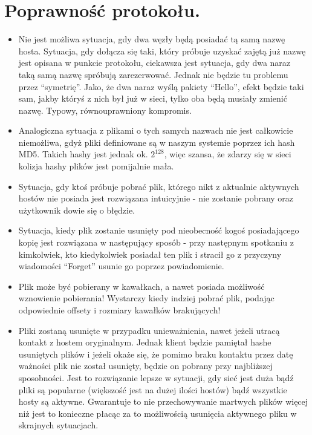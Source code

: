 \documentclass[10pt,a4paper]{article}
\begin{document}
\section{Poprawność protokołu.}
\begin{itemize}
\item Nie jest możliwa sytuacja, gdy dwa węzły będą posiadać tą samą nazwę hosta. Sytuacja, gdy dołącza się taki, który próbuje uzyskać zajętą już nazwę jest opisana w punkcie protokołu, ciekawsza jest sytuacja, gdy dwa naraz taką samą nazwę spróbują zarezerwować. Jednak nie będzie tu problemu przez “symetrię”. Jako, że dwa naraz wyślą pakiety “Hello”, efekt będzie taki sam, jakby któryś z nich był już w sieci, tylko oba będą musiały zmienić nazwę. Typowy, równouprawniony kompromis.
\item Analogiczna sytuacja z plikami o tych samych nazwach nie jest
całkowicie niemożliwa, gdyż pliki definiowane są w naszym systemie poprzez
ich hash MD5. Takich hashy jest jednak ok. $2^{128}$, więc szansa,
że zdarzy się w sieci kolizja hashy plików jest pomijalnie mała.
\item Sytuacja, gdy ktoś próbuje pobrać plik, którego nikt z aktualnie aktywnych hostów nie posiada jest rozwiązana intuicyjnie - nie zostanie pobrany oraz użytkownik dowie się o błędzie.
\item Sytuacja, kiedy plik zostanie usunięty pod nieobecność kogoś
posiadającego kopię jest rozwiązana w następujący sposób -
przy następnym spotkaniu z kimkolwiek, kto kiedykolwiek posiadał ten plik
i stracił go z przyczyny wiadomości “Forget”  usunie go poprzez
powiadomienie.
\item Plik może być pobierany w kawałkach, a nawet posiada możliwość wznowienie pobierania! Wystarczy kiedy indziej pobrać plik, podając odpowiednie offsety i rozmiary kawałków brakujących!
\item Pliki zostaną usunięte w przypadku unieważnienia, nawet jeżeli utracą kontakt z hostem oryginalnym. Jednak klient będzie pamiętał hashe usuniętych plików i jeżeli okaże się, że pomimo braku kontaktu przez datę ważności plik nie został usunięty, będzie on pobrany przy najbliższej sposobności. Jest to rozwiązanie lepsze w sytuacji, gdy sieć jest duża bądź pliki są popularne (większość jest na dużej ilości hostów) bądź wszystkie hosty są aktywne. Gwarantuje to nie przechowywanie martwych plików więcej niż jest to konieczne płacąc za to możliwością usunięcia aktywnego pliku w skrajnych sytuacjach.
\end{itemize}
\end{document}

